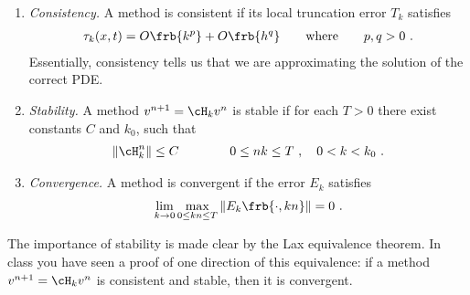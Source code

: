 \documentclass{article}
\begin{document}






\begin{exerciseList}



\item
\begin{enumerate}
\item
{\textit{Consistency.}}\quad 
A method is consistent if its local truncation error $T_k$ satisfies 
\begin{gather} 	
\tau_k(x,t)=O\frb{k^p}+O\frb{h^q}
\qquad
\text{where}\qquad p,q>0\ . 
\end{gather} 
Essentially, consistency tells us that we are approximating the solution of the correct PDE. 

\item
{\textit{Stability.}}\quad 
A method $v^{n+1}=\cH_kv^n$ is stable if for each $T>0$ there exist constants $C$ and $k_0$, such that 
\begin{gather} 	
	\|\cH_k^n\|\le C \qquad\qquad 0\le 
nk\le T\ , \quad 0<k<k_0\ . 
\end{gather}

\item
{\textit{Convergence.}}\quad
A method is convergent if the error $E_k$ satisfies 
\begin{gather} 	
	\lim_{k\to0} \max_{0\le kn\le T}\|E_k\frb{\cdot,kn}\| = 0 \ . 
\end{gather} 
\end{enumerate}

The importance of stability is made clear by the Lax equivalence theorem. In class you have seen a proof of one direction of this equivalence: if a method $v^{n+1}=\cH_kv^n$ is consistent and stable, then it is convergent. 




\end{exerciseList}
\end{document}
